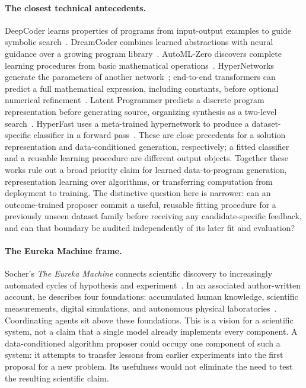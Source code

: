 \paragraph{The closest technical antecedents.}
DeepCoder learns properties of programs from input-output examples to guide
symbolic search~\cite{balog2017deepcoder}. DreamCoder combines learned abstractions with
neural guidance over a growing program library~\cite{ellis2021dreamcoder}.
AutoML-Zero discovers complete learning procedures from basic mathematical
operations~\cite{real2020automlzero}. HyperNetworks generate the parameters of another
network~\cite{ha2017hypernetworks}; end-to-end transformers can predict a full mathematical
expression, including constants, before optional numerical
refinement~\cite{kamienny2022e2e}. Latent Programmer predicts a discrete
program representation before generating source, organizing synthesis as a
two-level search~\cite{hong2021latent}. HyperFast uses a meta-trained
hypernetwork to produce a dataset-specific classifier in a forward
pass~\cite{bonet2024hyperfast}. These are close precedents for a solution representation
and data-conditioned generation, respectively; a fitted classifier and a
reusable learning procedure are different output objects. Together these works rule out a broad
priority claim for learned data-to-program generation, representation
learning over algorithms, or transferring computation from deployment to
training. The distinctive question here is narrower: can an outcome-trained
proposer commit a useful, reusable fitting procedure for a previously unseen
dataset family before receiving any candidate-specific feedback, and can that
boundary be audited independently of its later fit and evaluation?

\paragraph{The Eureka Machine frame.}
Socher's \emph{The Eureka Machine} connects scientific discovery to increasingly
automated cycles of hypothesis and experiment~\cite{socher2026eureka}. In an
associated author-written account, he describes four foundations: accumulated
human knowledge, scientific measurements, digital simulations, and autonomous
physical laboratories~\cite{socher2026bookbite}. Coordinating agents sit above these
foundations. This is a vision for a scientific system, not a claim that a
single model already implements every component. A data-conditioned algorithm
proposer could occupy one component of such a system: it attempts to transfer
lessons from earlier experiments into the first proposal for a new problem.
Its usefulness would not eliminate the need to test the resulting scientific
claim.

